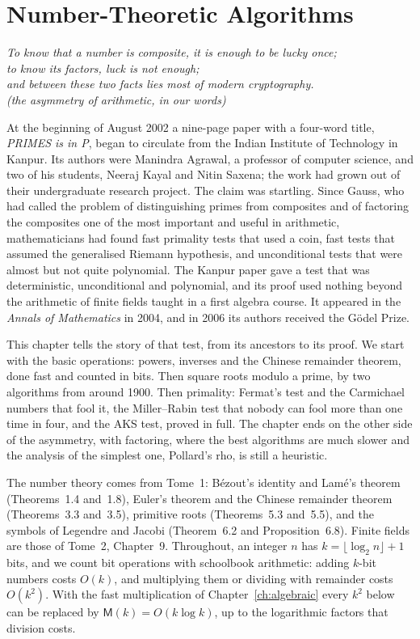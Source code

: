 \chapter{Number-Theoretic Algorithms}\label{ch:numbertheory}

\begin{center}\itshape
To know that a number is composite, it is enough to be lucky once;\\
to know its factors, luck is not enough;\\
and between these two facts lies most of modern cryptography.\\
\upshape(the asymmetry of arithmetic, in our words)
\end{center}

At the beginning of August 2002 a nine-page paper with a four-word title, \emph{PRIMES is in P}, began to circulate from the Indian Institute of Technology in Kanpur. Its authors were Manindra Agrawal, a professor of
computer science, and two of his students, Neeraj Kayal and Nitin Saxena; the work had grown out of their undergraduate research project. The claim was startling. Since Gauss, who had called the problem of distinguishing primes from composites and of factoring the composites one of the most
important and useful in arithmetic, mathematicians had found fast primality tests that used a coin, fast tests that assumed the generalised Riemann hypothesis, and unconditional tests that were almost but not quite polynomial. The Kanpur paper gave a test that was deterministic, unconditional and polynomial, and
its proof used nothing beyond the arithmetic of finite fields taught in a first algebra course. It appeared in the \emph{Annals of Mathematics} in 2004, and in 2006 its authors received the G\"odel Prize.

This chapter tells the story of that test, from its ancestors to its proof. We start with the basic operations: powers, inverses and the Chinese remainder theorem, done fast and counted in bits. Then square roots modulo a prime, by two
algorithms from around 1900. Then primality: Fermat's test and the Carmichael numbers that fool it, the Miller--Rabin test that nobody can fool more than one time in four, and the AKS test, proved in full. The chapter ends on the other side of the
asymmetry, with factoring, where the best algorithms are much slower and the analysis of the simplest one, Pollard's rho, is still a heuristic.

The number theory comes from Tome~1: Bézout's identity and Lamé's theorem (Theorems~1.4 and~1.8), Euler's theorem and the Chinese remainder theorem (Theorems~3.3 and~3.5), primitive roots (Theorems~5.3 and~5.5), and the symbols of Legendre and Jacobi (Theorem~6.2 and Proposition~6.8).
Finite fields are those of Tome~2, Chapter~9. Throughout, an integer $n$ has $k=\lfloor\log_2n\rfloor+1$ bits, and we count bit operations with schoolbook arithmetic: adding $k$-bit numbers costs $O(k)$, and multiplying them or dividing with remainder costs $O(k^2)$. With the fast multiplication of
Chapter~\ref{ch:algebraic} every $k^2$ below can be replaced by $\mathsf M(k)=O(k\log k)$, up to the logarithmic factors that division costs.

